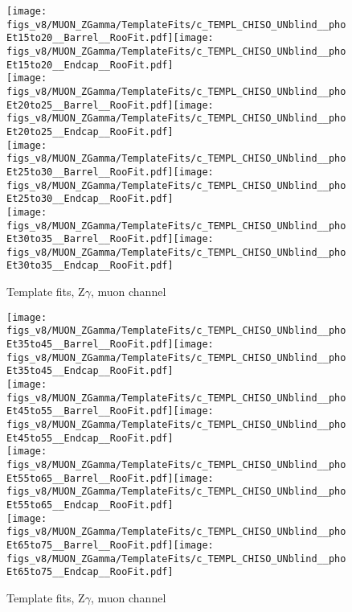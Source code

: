 \begin{figure}[htb]
  \begin{center}
   \texttt{[image: figs\_v8/MUON\_ZGamma/TemplateFits/c\_TEMPL\_CHISO\_UNblind\_\_phoEt15to20\_\_Barrel\_\_RooFit.pdf]}\texttt{[image: figs\_v8/MUON\_ZGamma/TemplateFits/c\_TEMPL\_CHISO\_UNblind\_\_phoEt15to20\_\_Endcap\_\_RooFit.pdf]}\\
   \texttt{[image: figs\_v8/MUON\_ZGamma/TemplateFits/c\_TEMPL\_CHISO\_UNblind\_\_phoEt20to25\_\_Barrel\_\_RooFit.pdf]}\texttt{[image: figs\_v8/MUON\_ZGamma/TemplateFits/c\_TEMPL\_CHISO\_UNblind\_\_phoEt20to25\_\_Endcap\_\_RooFit.pdf]}\\
   \texttt{[image: figs\_v8/MUON\_ZGamma/TemplateFits/c\_TEMPL\_CHISO\_UNblind\_\_phoEt25to30\_\_Barrel\_\_RooFit.pdf]}\texttt{[image: figs\_v8/MUON\_ZGamma/TemplateFits/c\_TEMPL\_CHISO\_UNblind\_\_phoEt25to30\_\_Endcap\_\_RooFit.pdf]}\\
   \texttt{[image: figs\_v8/MUON\_ZGamma/TemplateFits/c\_TEMPL\_CHISO\_UNblind\_\_phoEt30to35\_\_Barrel\_\_RooFit.pdf]}\texttt{[image: figs\_v8/MUON\_ZGamma/TemplateFits/c\_TEMPL\_CHISO\_UNblind\_\_phoEt30to35\_\_Endcap\_\_RooFit.pdf]}\\
  \label{fig:templateFits_CHISO_MUON_ZGamma_1}
  \caption{Template fits, Z$\gamma$, muon channel}
  \end{center}
\end{figure}

\begin{figure}[htb]
  \begin{center}
   \texttt{[image: figs\_v8/MUON\_ZGamma/TemplateFits/c\_TEMPL\_CHISO\_UNblind\_\_phoEt35to45\_\_Barrel\_\_RooFit.pdf]}\texttt{[image: figs\_v8/MUON\_ZGamma/TemplateFits/c\_TEMPL\_CHISO\_UNblind\_\_phoEt35to45\_\_Endcap\_\_RooFit.pdf]}\\
   \texttt{[image: figs\_v8/MUON\_ZGamma/TemplateFits/c\_TEMPL\_CHISO\_UNblind\_\_phoEt45to55\_\_Barrel\_\_RooFit.pdf]}\texttt{[image: figs\_v8/MUON\_ZGamma/TemplateFits/c\_TEMPL\_CHISO\_UNblind\_\_phoEt45to55\_\_Endcap\_\_RooFit.pdf]}\\
   \texttt{[image: figs\_v8/MUON\_ZGamma/TemplateFits/c\_TEMPL\_CHISO\_UNblind\_\_phoEt55to65\_\_Barrel\_\_RooFit.pdf]}\texttt{[image: figs\_v8/MUON\_ZGamma/TemplateFits/c\_TEMPL\_CHISO\_UNblind\_\_phoEt55to65\_\_Endcap\_\_RooFit.pdf]}\\
   \texttt{[image: figs\_v8/MUON\_ZGamma/TemplateFits/c\_TEMPL\_CHISO\_UNblind\_\_phoEt65to75\_\_Barrel\_\_RooFit.pdf]}\texttt{[image: figs\_v8/MUON\_ZGamma/TemplateFits/c\_TEMPL\_CHISO\_UNblind\_\_phoEt65to75\_\_Endcap\_\_RooFit.pdf]}\\
  \label{fig:templateFits_CHISO_MUON_ZGamma_2}
  \caption{Template fits, Z$\gamma$, muon channel}
  \end{center}
\end{figure}

